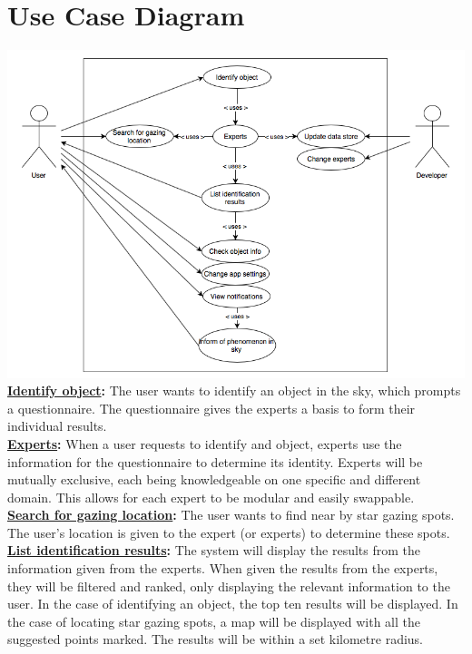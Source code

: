 \documentclass[]{article}
\begin{document}

\section{Use Case Diagram}
\label{sec:use_case_diagram}
\includegraphics[scale=0.6]{UseCaseDiagram} \\
\newline
\textbf{\underline{Identify object}:} The user wants to identify an object in the sky, which prompts a questionnaire. The questionnaire gives the experts a basis to form their individual results.\\
\newline
\textbf{\underline{Experts}:} When a user requests to identify and object, experts use the information for the questionnaire to determine its identity. Experts will be mutually exclusive, each being knowledgeable on one specific and different domain. This allows for each expert to be modular and easily swappable. \\
\newline
\textbf{\underline{Search for gazing location}:} The user wants to find near by star gazing spots. The user's location is given to the expert (or experts) to determine these spots. \\
\newline
\textbf{\underline{List identification results}:} The system will display the results from the information given from the experts. When given the results from the experts, they will be filtered and ranked, only displaying the relevant information to the user. In the case of identifying an object, the top ten results will be displayed. In the case of locating star gazing spots, a map will be displayed with all the suggested points marked. The results will be within a set kilometre radius.\\
\end{document}
